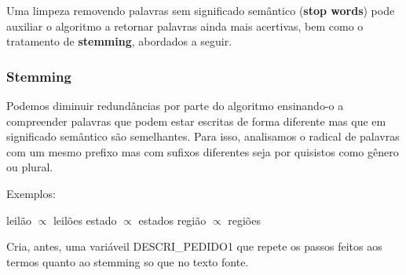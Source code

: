 \documentclass[]{article}
\begin{document}
Uma limpeza removendo palavras sem significado semântico (\textbf{stop
words}) pode auxiliar o algoritmo a retornar palavras ainda mais
acertivas, bem como o tratamento de \textbf{stemming}, abordados a
seguir.

\subsubsection{Stemming}\label{stemming}

Podemos diminuir redundâncias por parte do algoritmo ensinando-o a
compreender palavras que podem estar escritas de forma diferente mas que
em significado semântico são semelhantes. Para isso, analisamos o
radical de palavras com um mesmo prefixo mas com sufixos diferentes seja
por quisistos como gênero ou plural.

Exemplos:

leilão \(\propto\) leilões estado \(\propto\) estados região \(\propto\)
regiões

Cria, antes, uma variáveil DESCRI\_PEDIDO1 que repete os passos feitos
aos termos quanto ao stemming so que no texto fonte.
\end{document}
